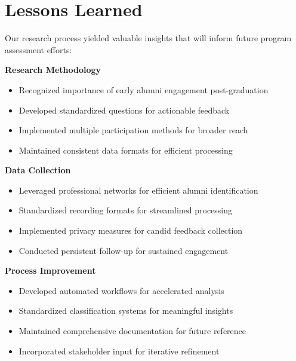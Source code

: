 \documentclass[12pt,a4paper]{article}
\begin{document}
\newpage

\section{Lessons Learned}
Our research process yielded valuable insights that will inform future program assessment efforts:


\noindent\textbf{Research Methodology}
\begin{itemize}
\item Recognized importance of early alumni engagement post-graduation
\item Developed standardized questions for actionable feedback
\item Implemented multiple participation methods for broader reach
\item Maintained consistent data formats for efficient processing
\end{itemize}
\textbf{Data Collection}
\begin{itemize}
\item Leveraged professional networks for efficient alumni identification
\item Standardized recording formats for streamlined processing
\item Implemented privacy measures for candid feedback collection
\item Conducted persistent follow-up for sustained engagement
\end{itemize}
\textbf{Process Improvement}
\begin{itemize}
\item Developed automated workflows for accelerated analysis
\item Standardized classification systems for meaningful insights
\item Maintained comprehensive documentation for future reference
\item Incorporated stakeholder input for iterative refinement
\end{itemize}

\newpage
\end{document}

